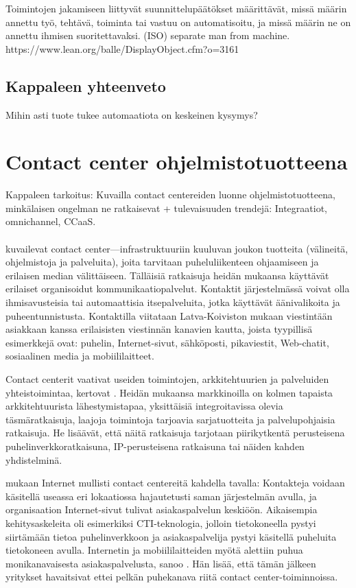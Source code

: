 \documentclass[finnish,12pt,a4paper,pdftex]{article}
\begin{document}
 
 Toimintojen jakamiseen liittyvät suunnittelupäätökset määrittävät, missä määrin annettu työ, tehtävä, toiminta tai vastuu on automatisoitu, ja missä määrin ne on annettu ihmisen suoritettavaksi. (ISO)
 separate man from machine. https://www.lean.org/balle/DisplayObject.cfm?o=3161 

\subsection{Kappaleen yhteenveto}

Mihin asti tuote tukee automaatiota on keskeinen kysymys?

\section{Contact center ohjelmistotuotteena}
Kappaleen tarkoitus: Kuvailla contact centereiden luonne ohjelmistotuotteena, minkälaisen ongelman ne ratkaisevat + tulevaisuuden trendejä: Integraatiot, omnichannel, CCaaS.\\\\

\cite{ccgartner} kuvailevat contact center—infrastruktuuriin kuuluvan joukon tuotteita (välineitä, ohjelmistoja ja palveluita), joita tarvitaan puheluliikenteen ohjaamiseen ja erilaisen median välittäiseen. Tälläisiä ratkaisuja heidän mukaansa käyttävät erilaiset organisoidut kommunikaatiopalvelut. Kontaktit järjestelmässä voivat olla ihmisavusteisia tai automaattisia itsepalveluita, jotka käyttävät äänivalikoita ja puheentunnistusta. Kontaktilla viitataan Latva-Koiviston \citeyearpar{latvakoivisto} mukaan viestintään asiakkaan kanssa erilaisisten viestinnän kanavien kautta, joista tyypillisä esimerkkejä ovat: puhelin, Internet-sivut, sähköposti, pikaviestit, Web-chatit, sosiaalinen media ja mobiililaitteet.

Contact centerit vaativat useiden toimintojen, arkkitehtuurien ja palveluiden yhteistoimintaa, kertovat \cite{ccgartner}. Heidän mukaansa markkinoilla on kolmen tapaista arkkitehtuurista lähestymistapaa, yksittäisiä integroitavissa olevia täsmäratkaisuja, laajoja toimintoja tarjoavia sarjatuotteita ja palvelupohjaisia ratkaisuja. He lisäävät, että näitä ratkaisuja tarjotaan piirikytkentä perusteisena puhelinverkkoratkaisuna, IP-perusteisena ratkaisuna tai näiden kahden yhdistelminä. 

\citeauthor{bernier} mukaan Internet mullisti contact centereitä kahdella tavalla: Kontakteja voidaan käsitellä useassa eri lokaatiossa hajautetusti saman järjestelmän avulla, ja organisaation Internet-sivut tulivat asiakaspalvelun keskiöön. Aikaisempia kehitysaskeleita oli esimerkiksi CTI-teknologia, jolloin tietokoneella pystyi siirtämään tietoa puhelinverkkoon ja asiakaspalvelija pystyi käsitellä puheluita tietokoneen avulla. Internetin ja mobiililaitteiden myötä alettiin puhua monikanavaisesta asiakaspalvelusta, sanoo \citeauthor{bernier}. Hän lisää, että tämän jälkeen yritykset havaitsivat ettei pelkän puhekanava riitä contact center-toiminnoissa. 
\end{document}
